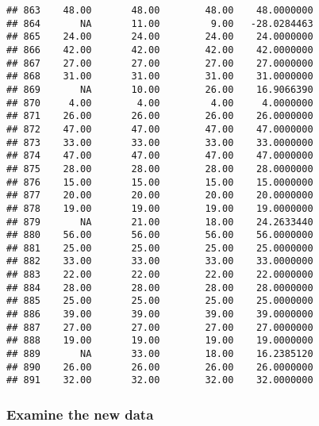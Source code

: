 \documentclass[
]{article}
\begin{document}
\begin{verbatim}
## 863    48.00       48.00        48.00    48.0000000
## 864       NA       11.00         9.00   -28.0284463
## 865    24.00       24.00        24.00    24.0000000
## 866    42.00       42.00        42.00    42.0000000
## 867    27.00       27.00        27.00    27.0000000
## 868    31.00       31.00        31.00    31.0000000
## 869       NA       10.00        26.00    16.9066390
## 870     4.00        4.00         4.00     4.0000000
## 871    26.00       26.00        26.00    26.0000000
## 872    47.00       47.00        47.00    47.0000000
## 873    33.00       33.00        33.00    33.0000000
## 874    47.00       47.00        47.00    47.0000000
## 875    28.00       28.00        28.00    28.0000000
## 876    15.00       15.00        15.00    15.0000000
## 877    20.00       20.00        20.00    20.0000000
## 878    19.00       19.00        19.00    19.0000000
## 879       NA       21.00        18.00    24.2633440
## 880    56.00       56.00        56.00    56.0000000
## 881    25.00       25.00        25.00    25.0000000
## 882    33.00       33.00        33.00    33.0000000
## 883    22.00       22.00        22.00    22.0000000
## 884    28.00       28.00        28.00    28.0000000
## 885    25.00       25.00        25.00    25.0000000
## 886    39.00       39.00        39.00    39.0000000
## 887    27.00       27.00        27.00    27.0000000
## 888    19.00       19.00        19.00    19.0000000
## 889       NA       33.00        18.00    16.2385120
## 890    26.00       26.00        26.00    26.0000000
## 891    32.00       32.00        32.00    32.0000000
\end{verbatim}

\hypertarget{examine-the-new-data}{%
\subsubsection{Examine the new data}\label{examine-the-new-data}}
\end{document}
